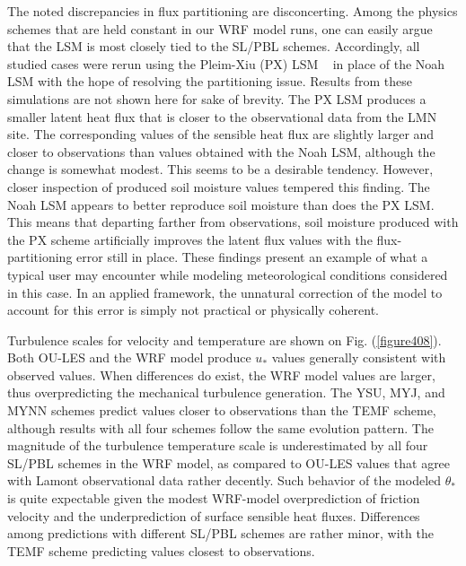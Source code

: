 The noted discrepancies in flux partitioning are disconcerting. Among the physics schemes that are held constant in our WRF model runs, one can easily argue that the LSM is most closely tied to the SL\slash PBL schemes. Accordingly, all studied cases were rerun using the Pleim-Xiu (PX) LSM ~\citep{PleimXiu95, XiuPleim01} in place of the Noah LSM with the hope of resolving the partitioning issue. Results from these simulations are not shown here for sake of brevity. The PX LSM produces a smaller latent heat flux that is closer to the observational data from the LMN site. The corresponding values of the sensible heat flux are slightly larger and closer to observations than values obtained with the Noah LSM, although the change is somewhat modest. This seems to be a desirable tendency. However, closer inspection of produced soil moisture values tempered this finding. The Noah LSM appears to better reproduce soil moisture than does the PX LSM. This means that departing farther from observations, soil moisture produced with the PX scheme artificially improves the latent flux values with the flux-partitioning error still in place. These findings present an example of what a typical user may encounter while modeling meteorological conditions considered in this case. In an applied framework, the unnatural correction of the model to account for this error is simply not practical or physically coherent.

Turbulence scales for velocity and temperature are shown on Fig. (\autoref{figure408}). Both OU-LES and the WRF model produce $u_*$ values generally consistent with observed values. When differences do exist, the WRF model values are larger, thus overpredicting the mechanical turbulence generation. The YSU, MYJ, and MYNN schemes predict values closer to observations than the TEMF scheme, although results with all four schemes follow the same evolution pattern. The magnitude of the turbulence temperature scale is underestimated by all four SL\slash PBL schemes in the WRF model, as compared to OU-LES values that agree with Lamont observational data rather decently. Such behavior of the modeled $\theta_*$ is quite expectable given the modest WRF-model overprediction of friction velocity and the underprediction of surface sensible heat fluxes. Differences among predictions with different SL\slash PBL schemes are rather minor, with the TEMF scheme predicting values closest to observations.


